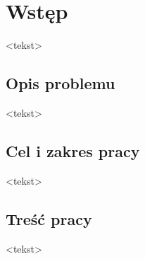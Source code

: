 \chapter*{Wstęp}

<tekst>


\section*{Opis problemu}

<tekst>


\section*{Cel i zakres pracy}

<tekst>


\section*{Treść pracy}

<tekst>
